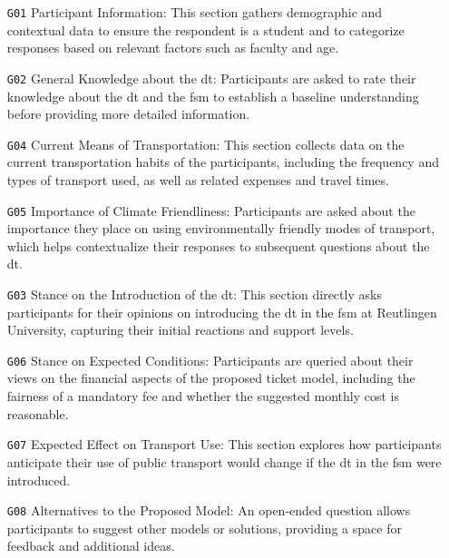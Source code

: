 \begin{itemize}
    \item[\texttt{G01}] Participant Information:
    This section gathers demographic and contextual data to ensure the respondent is a student and to categorize responses based on relevant factors such as faculty and age.\\

    \item[\texttt{G02}] General Knowledge about the \gls{dt}: Participants are asked to rate their knowledge about the \gls{dt} and the \gls{fsm} to establish a baseline understanding before providing more detailed information.\\

    \item[\texttt{G04}] Current Means of Transportation: This section collects data on the current transportation habits of the participants, including the frequency and types of transport used, as well as related expenses and travel times.\\

    \item[\texttt{G05}] Importance of Climate Friendliness: Participants are asked about the importance they place on using environmentally friendly modes of transport, which helps contextualize their responses to subsequent questions about the \gls{dt}.\\
    
    \item[\texttt{G03}] Stance on the Introduction of the \gls{dt}: This section directly asks participants for their opinions on introducing the \gls{dt} in the \gls{fsm} at Reutlingen University, capturing their initial reactions and support levels.\\

    \item[\texttt{G06}] Stance on Expected Conditions: Participants are queried about their views on the financial aspects of the proposed ticket model, including the fairness of a mandatory fee and whether the suggested monthly cost is reasonable.\\

    \item[\texttt{G07}] Expected Effect on Transport Use: This section explores how participants anticipate their use of public transport would change if the \gls{dt} in the \gls{fsm} were introduced.\\

    \item[\texttt{G08}] Alternatives to the Proposed Model: An open-ended question allows participants to suggest other models or solutions, providing a space for feedback and additional ideas.\\
\end{itemize}

